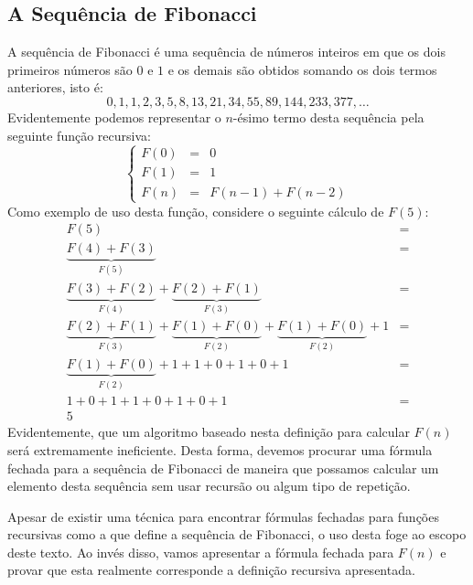 \subsection{A Sequência de Fibonacci}

A sequência de Fibonacci é uma sequência de números inteiros em que os
dois primeiros números são $0$ e $1$ e os demais são obtidos somando
os dois termos anteriores, isto é:
\[
0,1,1,2,3,5,8,13,21, 34, 55, 89, 144, 233, 377, …
\]
Evidentemente podemos representar o $n$-ésimo termo desta sequência
pela seguinte função recursiva:
\[
\left\{
\begin{array}{lcl}
F(0) & = & 0 \\
F(1) & = & 1 \\
F(n) & = & F(n - 1) + F(n - 2)
\end{array}
\right.
\]
Como exemplo de uso desta função, considere o seguinte cálculo de $F(5)$:
\[
\begin{array}{lc}
F(5) & = \\
\underbrace{F(4) + F(3)}_{F(5)} & = \\
\underbrace{F(3) + F(2)}_{F(4)} + \underbrace{F(2) + F(1)}_{F(3)} & = \\
\underbrace{F(2) + F(1)}_{F(3)} + \underbrace{F(1) + F(0)}_{F(2)} +
\underbrace{F(1) + F(0)}_{F(2)} + 1 & = \\
\underbrace{F(1) + F(0)}_{F(2)} + 1 + 1 + 0 + 1 + 0 + 1& =\\
1 + 0 + 1 + 1 + 0 + 1 + 0 + 1& = \\
5
\end{array}
\]
Evidentemente, que um algoritmo baseado nesta definição para calcular
$F(n)$ será extremamente ineficiente. Desta forma, devemos procurar
uma fórmula fechada para a sequência de Fibonacci de maneira que
possamos calcular um elemento desta sequência sem usar recursão ou
algum tipo de repetição.

Apesar de existir uma técnica para encontrar fórmulas fechadas para
funções recursivas como a que define a sequência de Fibonacci, o uso desta
foge ao escopo deste texto. Ao invés disso, vamos apresentar a fórmula
fechada para $F(n)$ e provar que esta realmente corresponde a
definição recursiva apresentada.

